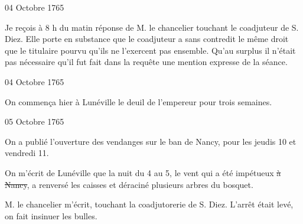                      \begin{diary}{04 Octobre 1765}{}
                        
                         Je reçois à 8 h du matin réponse de
                              M.
                              le chancelier touchant le
                              coadjuteur de S. Diez.
                           Elle porte en substance que le coadjuteur a
                           sans contredit le même droit que le titulaire
                           pourvu qu'ils ne l'exercent pas ensemble. Qu'au
                           surplus il n'était pas nécessaire qu'il fut fait
                           dans la requête une mention expresse de la
                           séance. \bigskip
        
        
                     \end{diary}
                     
                     \begin{diary}{04 Octobre 1765}{}
                        
                         On commença hier à Lunéville le deuil
                           de l'empereur pour
                           trois semaines. \bigskip
        
        
                     \end{diary}

                     \begin{diary}{05 Octobre 1765}{}
                        
                         On a publié l'ouverture des vendanges
                           sur le ban de Nancy, pour les jeudis 10 et vendredi 11.
                        \bigskip
        
        
                         On m'écrit de Lunéville que la nuit du 4
                              au 5, le vent qui a été 
                           impétueux \sout{à Nancy},
                           a renversé les caisses et déraciné plusieurs
                           arbres du bosquet. \bigskip
        
        
                        
                           M. le chancelier m'écrit,
                           touchant la
                           coadjutorerie de S. Diez.
                           L'arrêt était levé,
                           on fait insinuer les bulles. \bigskip
        
        
                     \end{diary}

